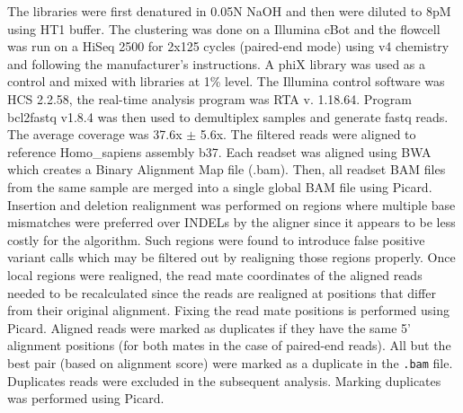 The libraries were first denatured in 0.05N NaOH and then were diluted to 8pM using HT1 buffer.
The clustering was done on a Illumina cBot and the flowcell was run on a HiSeq 2500 for 2x125 cycles (paired-end mode) using v4 chemistry and following the manufacturer's instructions.
A phiX library was used as a control and mixed with libraries at 1\% level.
The Illumina control software was HCS 2.2.58, the real-time analysis program was RTA v. 1.18.64. Program bcl2fastq v1.8.4 was then used to demultiplex samples and generate fastq reads.
The average coverage was 37.6x $\pm$ 5.6x.
The filtered reads were aligned to reference Homo\_sapiens assembly b37.
Each readset was aligned using {\sf BWA}\citep{Li2010} which creates a Binary Alignment Map file (.bam).
Then, all readset BAM files from the same sample are merged into a single global BAM file using Picard.
Insertion and deletion realignment was performed on regions where multiple base mismatches were preferred over INDELs by the aligner since it appears to be less costly for the algorithm.
Such regions were found to introduce false positive variant calls which may be filtered out by realigning those regions properly.
Once local regions were realigned, the read mate coordinates of the aligned reads needed to be recalculated since the reads are realigned at positions that differ from their original alignment.
Fixing the read mate positions is performed using Picard.
Aligned reads were marked as duplicates if they have the same 5' alignment positions (for both mates in the case of paired-end reads).
All but the best pair (based on alignment score) were marked as a duplicate in the \verb!.bam! file.
Duplicates reads were excluded in the subsequent analysis. Marking duplicates was performed using Picard.

